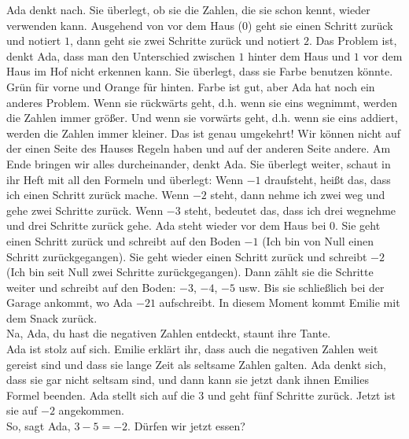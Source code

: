 Ada denkt nach. 
Sie überlegt, ob sie die Zahlen, die sie schon kennt, wieder verwenden kann. Ausgehend von vor dem Haus ($0$) geht sie einen Schritt zurück und notiert $1$, dann geht sie zwei Schritte zurück und notiert $2$. 
Das Problem ist, denkt Ada, dass man den Unterschied zwischen $1$ hinter dem Haus und $1$ vor dem Haus im Hof nicht erkennen kann. 
Sie überlegt, dass sie Farbe benutzen könnte. 
Grün für vorne und Orange für hinten. 
Farbe ist gut, aber Ada hat noch ein anderes Problem. 
Wenn sie rückwärts geht, d.h. wenn sie eins wegnimmt, werden die Zahlen immer größer. Und wenn sie vorwärts geht, d.h. wenn sie eins addiert, werden die Zahlen immer kleiner.
Das ist genau umgekehrt! Wir können nicht auf der einen Seite des Hauses Regeln haben und auf der anderen Seite andere. 
Am Ende bringen wir alles durcheinander, denkt Ada. 
Sie überlegt weiter, schaut in ihr Heft mit all den Formeln und überlegt: Wenn $-1$ draufsteht, heißt das, dass ich einen Schritt zurück mache. Wenn $-2$ steht, dann nehme ich zwei weg und gehe zwei Schritte zurück. Wenn $-3$ steht, bedeutet das, dass ich drei wegnehme und drei Schritte zurück gehe. 
Ada steht wieder vor dem Haus bei $0$. Sie geht einen Schritt zurück und schreibt auf den Boden $-1$ (Ich bin von Null einen Schritt zurückgegangen). Sie geht wieder einen Schritt zurück und schreibt $-2$ (Ich bin seit Null zwei Schritte zurückgegangen). Dann zählt sie die Schritte weiter und schreibt auf den Boden: $-3$, $-4$, $-5$ usw. 
Bis sie schließlich bei der Garage ankommt, wo Ada $-21$ aufschreibt. 
In diesem Moment kommt Emilie mit dem Snack zurück.\\
\frqq{}Na, Ada, du hast die negativen Zahlen entdeckt\flqq{}, staunt ihre Tante.\\
Ada ist stolz auf sich. Emilie erklärt ihr, dass auch die negativen Zahlen weit gereist sind und dass sie lange Zeit als seltsame Zahlen galten. Ada denkt sich, dass sie gar nicht seltsam sind, und dann kann sie jetzt dank ihnen Emilies Formel beenden. Ada stellt sich auf die $3$ und geht fünf Schritte zurück. Jetzt ist sie auf $-2$ angekommen.\\
\frqq{}So\flqq{}, sagt Ada, \frqq{}$3 - 5 = -2$. Dürfen wir jetzt essen?\flqq{}

%    
